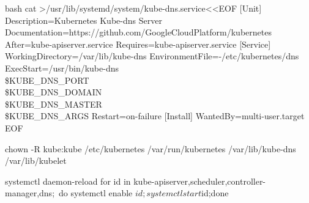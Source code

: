 \begin{code-block}{bash}
cat >/usr/lib/systemd/system/kube-dns.service<<EOF
[Unit]
Description=Kubernetes Kube-dns Server
Documentation=https://github.com/GoogleCloudPlatform/kubernetes
After=kube-apiserver.service
Requires=kube-apiserver.service
[Service]
WorkingDirectory=/var/lib/kube-dns
EnvironmentFile=-/etc/kubernetes/dns
ExecStart=/usr/bin/kube-dns \\
            \$KUBE_DNS_PORT \\
            \$KUBE_DNS_DOMAIN \\
            \$KUBE_DNS_MASTER \\
            \$KUBE_DNS_ARGS
Restart=on-failure
[Install]
WantedBy=multi-user.target
EOF

chown -R kube:kube /etc/kubernetes /var/run/kubernetes /var/lib/kube-dns /var/lib/kubelet

systemctl daemon-reload
for id in kube-{apiserver,scheduler,controller-manager,dns};\
    do systemctl enable $id;systemctl start $id;done
\end{code-block}

